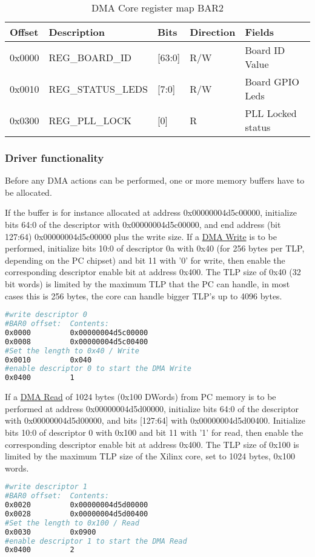 \begin{table}[H]
	\centering
	\begin{tabularx}{\textwidth}{|l|X|l|l|l|}
	\hline
	\textbf{Offset} & \textbf{Description} &\textbf{Bits}&\textbf{Direction}& \textbf{Fields}\\
	\hline
	0x0000  & REG\_BOARD\_ID & [63:0] & R/W & Board ID Value\\
	\hline
	0x0010  & REG\_STATUS\_LEDS & [7:0] & R/W & Board GPIO Leds\\
	\hline
	0x0300  & REG\_PLL\_LOCK & [0] & R & PLL Locked status\\
	\hline
	\end{tabularx}
	\caption{DMA Core register map BAR2}\label{tab:dma_register_map_bar2}
\end{table}
\newpage
\subsubsection{Driver functionality}
Before any DMA actions can be performed, one or more memory buffers have to be allocated. 

If the buffer is for instance allocated at address 0x00000004d5c00000, initialize bits 64:0 of the descriptor with 0x00000004d5c00000, and end address (bit 127:64) 0x00000004d5c00000 plus the write size. If a \underline{DMA Write} is to be performed, initialize bits 10:0 of descriptor 0a with 0x40 (for 256 bytes per TLP, depending on the PC chipset) and bit 11 with '0' for write, then enable the corresponding descriptor enable bit at address 0x400. The TLP size of 0x40 (32 bit words) is limited by the maximum TLP that the PC can handle, in most cases this is 256 bytes, the core can handle bigger TLP's up to 4096 bytes.
\begin{lstlisting}[language=BASH, frame=single, caption=Create a Write descriptor]
#write descriptor 0
#BAR0 offset:  Contents:
0x0000         0x00000004d5c00000
0x0008         0x00000004d5c00400
#Set the length to 0x40 / Write
0x0010         0x040
#enable descriptor 0 to start the DMA Write
0x0400         1
\end{lstlisting}
If a \underline{DMA Read} of 1024 bytes (0x100 DWords) from PC memory is to be performed at address 0x00000004d5d00000, initialize bits 64:0 of the descriptor with 0x00000004d5d00000, and bits [127:64] with 0x00000004d5d00400. Initialize bits 10:0 of descriptor 0 with 0x100 and bit 11 with '1' for read, then enable the corresponding descriptor enable bit at address 0x400. The TLP size of 0x100 is limited by the maximum TLP size of the Xilinx core, set to 1024 bytes, 0x100 words.
\begin{lstlisting}[language=BASH, frame=single, caption=Create a Read descriptor]
#write descriptor 1
#BAR0 offset:  Contents:
0x0020         0x00000004d5d00000
0x0028         0x00000004d5d00400
#Set the length to 0x100 / Read
0x0030         0x0900
#enable descriptor 1 to start the DMA Read
0x0400         2
\end{lstlisting}
\newpage
